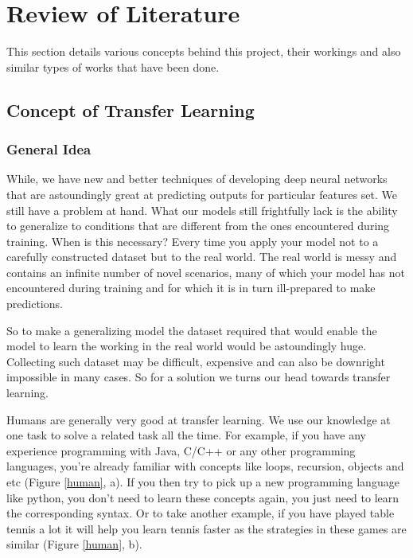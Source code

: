 \documentclass[a4paper, 12pt]{article}
\begin{document}
\begin{sloppypar}
\section {Review of Literature}

This section details various concepts behind this project, their workings and also similar types of works that have been done.

\subsection{Concept of Transfer Learning}

\subsubsection{General Idea}
While, we have new and better techniques of developing deep neural networks that are astoundingly great at predicting outputs for particular features set. We still have a problem at hand. What our models still frightfully lack is the ability to generalize to conditions that are different from the ones encountered during training. When is this necessary? Every time you apply your model not to a carefully constructed dataset but to the real world. The real world is messy and contains an infinite number of novel scenarios, many of which your model has not encountered during training and for which it is in turn ill-prepared to make predictions. \cite{noauthor_transfer_2017}

So to make a generalizing model the dataset required that would enable the model to learn the working in the real world would be astoundingly huge. Collecting such dataset may be difficult, expensive and can also be downright impossible in many cases. So for a solution we turns our head towards transfer learning.

Humans are generally very good at transfer learning. We use our knowledge at one task to solve a related task all the time. For example, if you have any experience programming with Java, C/C++ or any other programming languages, you’re already familiar with concepts like loops, recursion, objects and etc (Figure \ref{human}, a). If you then try to pick up a new programming language like python, you don't need to learn these concepts again, you just need to learn the corresponding syntax. Or to take another example, if you have played table tennis a lot it will help you learn tennis faster as the strategies in these games are similar (Figure \ref{human}, b). %


\end{sloppypar}
\end{document}
